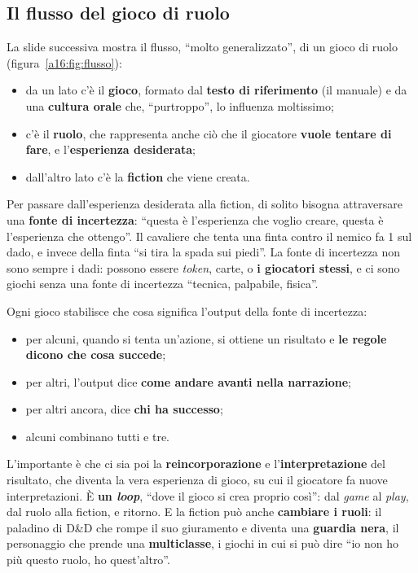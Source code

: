 \subsection{Il flusso del gioco di ruolo}



La slide successiva mostra il flusso, ``molto generalizzato'', di un gioco di ruolo
(figura~\ref{a16:fig:flusso}):
\begin{itemize}
  \item da un lato c'è il \textbf{gioco}, formato dal \textbf{testo di riferimento} (il manuale) e
        da una \textbf{cultura orale} che, ``purtroppo'', lo influenza moltissimo;
  \item c'è il \textbf{ruolo}, che rappresenta anche ciò che il giocatore \textbf{vuole tentare di
        fare}, e l'\textbf{esperienza desiderata};
  \item dall'altro lato c'è la \textbf{fiction} che viene creata.
\end{itemize}
Per passare dall'esperienza desiderata alla fiction, di solito bisogna attraversare una
\textbf{fonte di incertezza}: ``questa è l'esperienza che voglio creare, questa è l'esperienza che
ottengo''. Il cavaliere che tenta una finta contro il nemico fa 1 sul dado, e invece della finta
``si tira la spada sui piedi''. La fonte di incertezza non sono sempre i dadi: possono essere
\emph{token}, carte, o \textbf{i giocatori stessi}, e ci sono giochi senza una fonte di incertezza
``tecnica, palpabile, fisica''.

Ogni gioco stabilisce che cosa significa l'output della fonte di incertezza:
\begin{itemize}
  \item per alcuni, quando si tenta un'azione, si ottiene un risultato e \textbf{le regole dicono
        che cosa succede};
  \item per altri, l'output dice \textbf{come andare avanti nella narrazione};
  \item per altri ancora, dice \textbf{chi ha successo};
  \item alcuni combinano tutti e tre.
\end{itemize}
L'importante è che ci sia poi la \textbf{reincorporazione} e l'\textbf{interpretazione} del
risultato, che diventa la vera esperienza di gioco, su cui il giocatore fa nuove interpretazioni.
È \textbf{un \emph{loop}}, ``dove il gioco si crea proprio così'': dal \emph{game} al \emph{play},
dal ruolo alla fiction, e ritorno. E la fiction può anche \textbf{cambiare i ruoli}: il paladino di
D\&D che rompe il suo giuramento e diventa una \textbf{guardia nera}, il personaggio che prende una
\textbf{multiclasse}, i giochi in cui si può dire ``io non ho più questo ruolo, ho quest'altro''.

